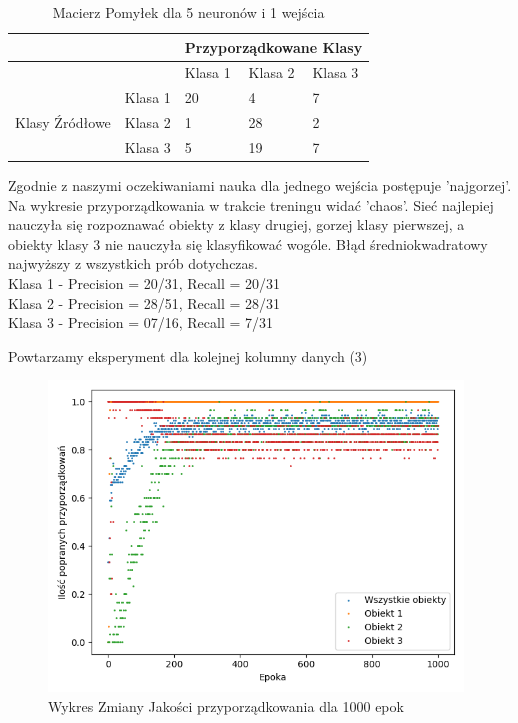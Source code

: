 \documentclass[12pt]{article}
\begin{document}
\begin{table}
\caption{\label{tab:tablica17} Macierz Pomyłek dla 5 neuronów  i 1 wejścia}
\begin{tabular}{ |p{3cm}|p{3cm}|p{2cm}|p{2cm}|p{2cm}|  }
 \hline
 & & 
 \multicolumn{3}{|c|}{Przyporządkowane Klasy} \\
 \hline

   & & Klasa 1 & Klasa 2 & Klasa 3\\
 \hline
\multirow{3}{4em}{Klasy Źródłowe}
   & Klasa 1 & 20 & 4 & 7 \\ 
   & Klasa 2 & 1  & 28 & 2 \\
   & Klasa 3 & 5  & 19  & 7 \\
 \hline
\end{tabular}
\end{table}
Zgodnie z naszymi oczekiwaniami nauka dla jednego wejścia postępuje 'najgorzej'. Na wykresie przyporządkowania w trakcie treningu widać 'chaos'. Sieć najlepiej nauczyła się rozpoznawać obiekty z klasy drugiej, gorzej klasy pierwszej, a obiekty klasy 3 nie nauczyła się klasyfikować wogóle. Błąd średniokwadratowy najwyższy z wszystkich prób dotychczas.
\\Klasa 1 - Precision = 20/31, Recall = 20/31\\
Klasa 2 - Precision = 28/51, Recall = 28/31\\
Klasa 3 - Precision = 07/16, Recall = 7/31\\

\newpage

Powtarzamy eksperyment dla kolejnej kolumny danych (3)

\begin{figure}[!ht]
 \centering
 \includegraphics[width=11cm]{WykresPrzyporzadkowania5neuron1wejscia2.png}
 \caption{Wykres Zmiany Jakości przyporządkowania dla 1000 epok}
 \vspace{-0.1cm}
 \label{WykresPrzyp19}
\end{figure}
\end{document}
